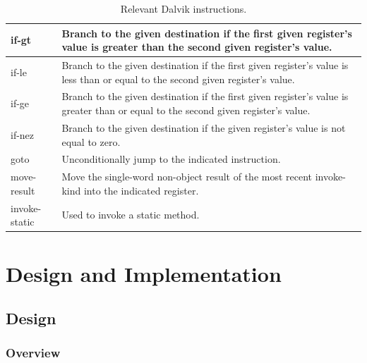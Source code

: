 \documentclass[parskip]{cs4rep}
\begin{document}
\begin{table}[htb]
\begin{tabular}{ | l | p{11.6cm} |}
    if-gt & Branch to the given destination if the first given register's value is greater than the second given register's value. \\ \hline
    if-le & Branch to the given destination if the first given register's value is less than or equal to the second given register's value. \\ \hline
    if-ge & Branch to the given destination if the first given register's value is greater than or equal to the second given register's value. \\ \hline
    if-nez & Branch to the given destination if the given register's value is not equal to zero. \\ \hline
    goto & Unconditionally jump to the indicated instruction. \\ \hline
    move-result & Move the single-word non-object result of the most recent invoke-kind into the indicated register. \\ \hline
    invoke-static & Used to invoke a static method. \\ \hline
    \end{tabular}
    \caption{Relevant Dalvik instructions.\cite{TheAndroidOpenSourceProject2007}}
    \label{tab:DalvikInstructions}
\end{table}

\chapter{Design and Implementation}

\section{Design}

\subsection{Overview}
\end{document}
